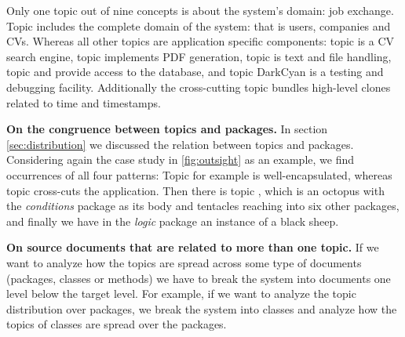 Only one topic out of nine concepts is about the system's domain: job exchange. Topic \red includes the complete domain of the system: that is users, companies and CVs. Whereas all other topics are application specific components: topic \blue is a CV search engine, topic \darkgreen implements PDF generation, topic \green is text and file handling, topic \cyan and \magenta provide access to the database, and topic DarkCyan is a testing and debugging facility. Additionally the cross-cutting topic \yellow bundles high-level clones related to time and timestamps.

\textbf{On the congruence between topics and packages.} In section \autoref{sec:distribution} we discussed the relation between topics and packages. Considering again the case study in \autoref{fig:outsight} as an example, we find occurrences of all four patterns: Topic \darkgreen for example is well-encapsulated, whereas topic \yellow cross-cuts the application. Then there is topic \blue, which is an octopus with the \emph{conditions} package as its body and tentacles reaching into six other packages, and finally we have in the \emph{logic} package an instance of a black sheep.

\textbf{On source documents that are related to more than one topic.} If we want to analyze how the topics are spread across some type of documents (\eg packages, classes or methods) we have to break the system into documents one level below the target level. For example, if we want to analyze the topic distribution over packages, we break the system into classes and analyze how the topics of classes are spread over the packages.

